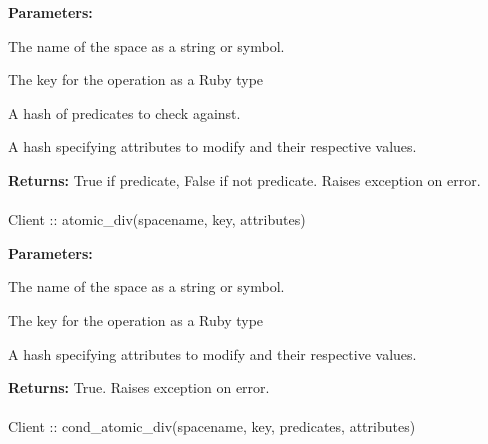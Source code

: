\noindent\textbf{Parameters:}
\begin{description}[labelindent=\widthof{{\code{predicates}}},leftmargin=*,noitemsep,nolistsep,align=right]
\item[\code{spacename}] The name of the space as a string or symbol.
\item[\code{key}] The key for the operation as a Ruby type
\item[\code{predicates}] A hash of predicates to check against.
\item[\code{attributes}] A hash specifying attributes to modify and their respective values.
\end{description}

\noindent\textbf{Returns:}
True if predicate, False if not predicate.  Raises exception on error.

\paragraph{}
\label{api:ruby:atomic_div}
\begin{ccode}
Client :: atomic_div(spacename, key, attributes)
\end{ccode}
\funcdesc 

\noindent\textbf{Parameters:}
\begin{description}[labelindent=\widthof{{\code{attributes}}},leftmargin=*,noitemsep,nolistsep,align=right]
\item[\code{spacename}] The name of the space as a string or symbol.
\item[\code{key}] The key for the operation as a Ruby type
\item[\code{attributes}] A hash specifying attributes to modify and their respective values.
\end{description}

\noindent\textbf{Returns:}
True.  Raises exception on error.

\paragraph{}
\label{api:ruby:cond_atomic_div}
\begin{ccode}
Client :: cond_atomic_div(spacename, key, predicates, attributes)
\end{ccode}
\funcdesc 

